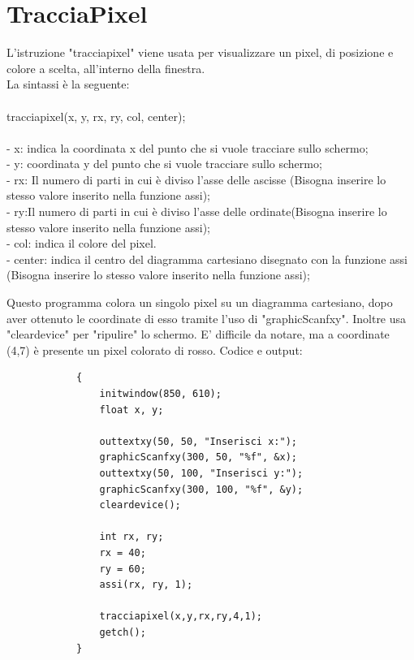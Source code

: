 \documentclass[12pt]{book}
\begin{document}

		\section{TracciaPixel}
			L'istruzione "tracciapixel" viene usata per visualizzare un pixel, di posizione e colore a scelta, all'interno della finestra.
			\\La sintassi è la seguente:
			\\
			\\
			\Large tracciapixel(x, y, rx, ry, col, center);
			\normalsize
			\\
			\\- x: indica la coordinata x del punto che si vuole tracciare sullo schermo;
			\\- y: coordinata y del punto che si vuole tracciare sullo schermo;
			\\- rx: Il numero di parti in cui è diviso l'asse delle ascisse (Bisogna inserire lo stesso valore inserito nella funzione assi);
			\\- ry:Il numero di parti in cui è diviso l'asse delle ordinate(Bisogna inserire lo stesso valore inserito nella funzione assi);
			\\- col: indica il colore del pixel.
			\\- center: indica il centro del diagramma cartesiano disegnato con la funzione assi (Bisogna inserire lo stesso valore inserito nella funzione assi);
			
			
			Questo programma colora un singolo pixel su un diagramma cartesiano, dopo aver ottenuto le coordinate di esso tramite l'uso di "graphicScanfxy". Inoltre usa "cleardevice" per "ripulire" lo schermo. E' difficile da notare, ma a coordinate (4,7) è presente un pixel colorato di rosso.
		\newpage Codice e output:\\			
		\begin{lstlisting}
			{
				initwindow(850, 610);
				float x, y;
				
				outtextxy(50, 50, "Inserisci x:");
				graphicScanfxy(300, 50, "%f", &x);
				outtextxy(50, 100, "Inserisci y:");
				graphicScanfxy(300, 100, "%f", &y);
				cleardevice();
				
				int rx, ry;
				rx = 40;
				ry = 60;
				assi(rx, ry, 1);
				
				tracciapixel(x,y,rx,ry,4,1);
				getch();
			}
		\end{lstlisting}
		
\end{document}
